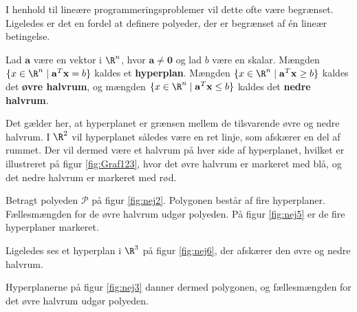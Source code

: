 \noindent
% 
%
%
I henhold til lineære programmeringsproblemer vil dette ofte være begrænset.
Ligeledes er det en fordel at definere polyeder, der er begrænset af én lineær betingelse. 
%
\begin{defn}{}{}
Lad $\mathbf{a}$ være en vektor i $\R^n$, hvor $\mathbf{a} \neq \mathbf{0}$ og lad $b$ være en skalar.
Mængden $\{x \in \R^n \mid \mathbf{a}^T \mathbf{x}=b\}$ kaldes et \textbf{hyperplan}.
%
Mængden $\{x \in \R^n \mid \mathbf{a}^T \mathbf{x} \geq b\}$ kaldes det \textbf{øvre halvrum}, og
mængden $\{x \in \R^n \mid \mathbf{a}^T \mathbf{x} \leq b\}$ kaldes det \textbf{nedre halvrum}.
\end{defn}
\noindent
%
Det gælder her, at hyperplanet er grænsen mellem de tilsvarende øvre og nedre halvrum.
I $\R^2$ vil hyperplanet således være en ret linje, som afskærer en del af rummet. 
Der vil dermed være et halvrum på hver side af hyperplanet, hvilket er illustreret på figur \ref{fig:Graf123}, hvor det øvre halvrum er markeret med blå, og det nedre halvrum er markeret med rød. 
%

%
Betragt polyeden $\mathcal{P}$ på figur \ref{fig:nej2}. 
Polygonen består af fire hyperplaner. 
Fællesmængden for de øvre halvrum udgør polyeden.
På figur \ref{fig:nej5} er de fire hyperplaner markeret. 
%
%

% 
%
%
Ligeledes ses et hyperplan i $\R^3$ på figur \ref{fig:nej6}, der afskærer den øvre og nedre halvrum.
%
%

%
%
Hyperplanerne på figur \ref{fig:nej3} danner dermed polygonen, og fællesmængden for det øvre halvrum udgør polyeden. 

